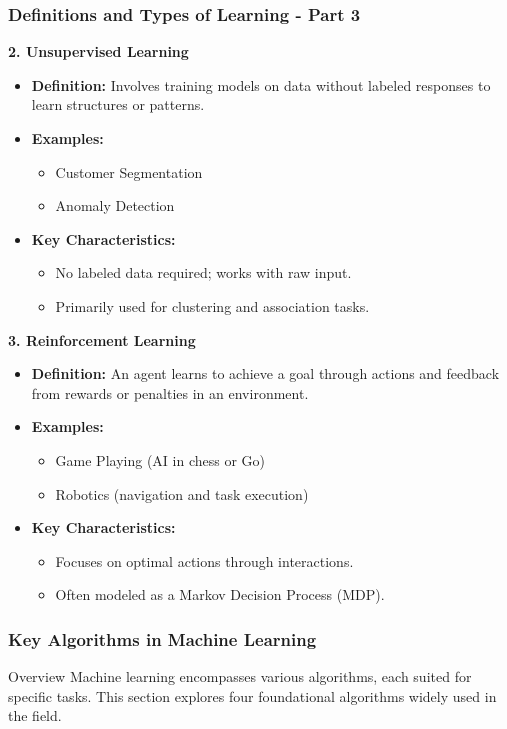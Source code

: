 \documentclass{beamer}
\begin{document}
\begin{frame}[fragile]
    \frametitle{Definitions and Types of Learning - Part 3}
    
    \textbf{2. Unsupervised Learning}
    \begin{itemize}
        \item \textbf{Definition:} Involves training models on data without labeled responses to learn structures or patterns.
        \item \textbf{Examples:}
        \begin{itemize}
            \item Customer Segmentation
            \item Anomaly Detection
        \end{itemize}
        \item \textbf{Key Characteristics:}
        \begin{itemize}
            \item No labeled data required; works with raw input.
            \item Primarily used for clustering and association tasks.
        \end{itemize}
    \end{itemize}

    \textbf{3. Reinforcement Learning}
    \begin{itemize}
        \item \textbf{Definition:} An agent learns to achieve a goal through actions and feedback from rewards or penalties in an environment.
        \item \textbf{Examples:}
        \begin{itemize}
            \item Game Playing (AI in chess or Go)
            \item Robotics (navigation and task execution)
        \end{itemize}
        \item \textbf{Key Characteristics:}
        \begin{itemize}
            \item Focuses on optimal actions through interactions.
            \item Often modeled as a Markov Decision Process (MDP).
        \end{itemize}
    \end{itemize}
\end{frame}

\begin{frame}[fragile]
    \frametitle{Key Algorithms in Machine Learning}
    \begin{block}{Overview}
        Machine learning encompasses various algorithms, each suited for specific tasks. This section explores four foundational algorithms widely used in the field.
    \end{block}
\end{frame}
\end{document}
